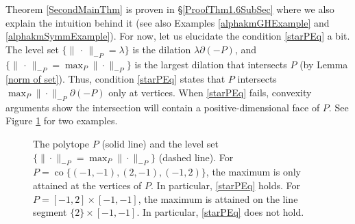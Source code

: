 \documentclass{article}
\renewcommand{\>}{\rightarrow}
\DeclareMathOperator{\Conv}{co}
\theoremstyle{plain}
\theoremstyle{definition}
\begin{document}
Theorem \ref{SecondMainThm} is proven in
\S\ref{ProofThm1.6SubSec} where we also explain the intuition behind it
(see also Examples \ref{alphakmGHExample} and \ref{alphakmSymmExample}).
For now, let us elucidate the condition \eqref{starPEq} a bit.
The level set $\{\|\,\cdot\,\|_{-P}=\lambda\}$ is the dilation 
$\lambda\partial(-P)$, and $\{\|\,\cdot\,\|_{-P}=\max_P\|\cdot\|_{-P}\}$ is the largest dilation that intersects $P$ (by Lemma \ref{norm of set}).
Thus, condition \eqref{starPEq} states that $P$ intersects $\max_P\|\cdot\|_{-P}\partial(-P)$ only at vertices. When \eqref{starPEq} fails, convexity arguments
 show the intersection will contain a positive-dimensional face of $P$.
See Figure \ref{*P example} for two examples. 

\begin{figure}
    \centering
    \begin{subfigure}{0.4\textwidth}
        \centering
    \end{subfigure}
    \begin{subfigure}{0.4\textwidth}
        \centering
    \end{subfigure}
    \caption{The polytope $P$ (solid line) and the level set $\{\|\cdot\|_{-P}=\max_P\|\cdot\|_{-P}\}$ (dashed line). For $P=\Conv\{(-1,-1),(2,-1),(-1,2)\}$, the maximum is only attained at the vertices of $P$. In particular, \eqref{starPEq} holds. For $P=[-1,2]\times[-1,-1]$, the maximum is attained on the line segment $\{2\}\times[-1,-1]$. In particular, \eqref{starPEq} does not hold.}\label{*P example}
\end{figure}
\end{document}
